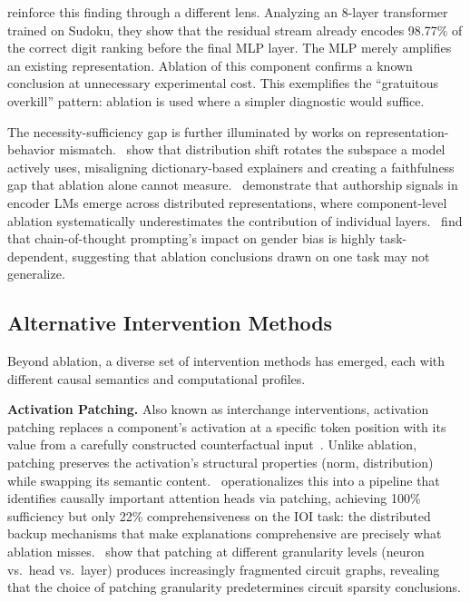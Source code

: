 \documentclass[pdflatex,sn-mathphys-num]{sn-jnl}
\begin{document}
\cite{KniazevFijalkow2026} reinforce this finding through a different lens. Analyzing an 8-layer transformer trained on Sudoku, they show that the residual stream already encodes 98.77\% of the correct digit ranking before the final MLP layer. The MLP merely amplifies an existing representation. Ablation of this component confirms a known conclusion at unnecessary experimental cost. This exemplifies the ``gratuitous overkill'' pattern: ablation is used where a simpler diagnostic would suffice.

The necessity-sufficiency gap is further illuminated by works on representation-behavior mismatch.~\cite{Lima2026} show that distribution shift rotates the subspace a model actively uses, misaligning dictionary-based explainers and creating a faithfulness gap that ablation alone cannot measure.~\cite{Kulumba2026} demonstrate that authorship signals in encoder LMs emerge across distributed representations, where component-level ablation systematically underestimates the contribution of individual layers.~\cite{Pearman2026} find that chain-of-thought prompting's impact on gender bias is highly task-dependent, suggesting that ablation conclusions drawn on one task may not generalize.


\subsection{Alternative Intervention Methods}

Beyond ablation, a diverse set of intervention methods has emerged, each with different causal semantics and computational profiles.

\textbf{Activation Patching.} Also known as interchange interventions, activation patching replaces a component's activation at a specific token position with its value from a carefully constructed counterfactual input~\cite{Vig2020,Wang2022}. Unlike ablation, patching preserves the activation's structural properties (norm, distribution) while swapping its semantic content.~\cite{Mahale2026} operationalizes this into a pipeline that identifies causally important attention heads via patching, achieving 100\% sufficiency but only 22\% comprehensiveness on the IOI task: the distributed backup mechanisms that make explanations comprehensive are precisely what ablation misses.~\cite{Conmy2023} show that patching at different granularity levels (neuron vs.\ head vs.\ layer) produces increasingly fragmented circuit graphs, revealing that the choice of patching granularity predetermines circuit sparsity conclusions.
\end{document}
